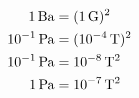 \documentclass[11pt]{article}
\begin{document}
\begin{align*}
	\unit[1]{Ba} &=(\unit[1]{G})^2 \\
	\unit[10^{-1}]{Pa} &=(\unit[10^{-4}]{T})^2 \\
	\unit[10^{-1}]{Pa} &=\unit[10^{-8}]{T^2} \\
	\unit[1]{Pa} &=\unit[10^{-7}]{T^2} \\
\end{align*}
\end{document}

